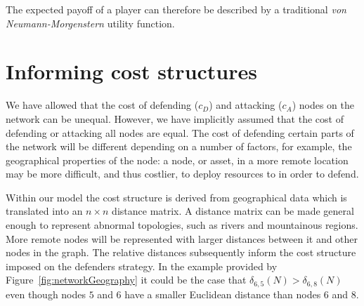 \documentclass[11pt,fleqn]{article}
\begin{document}
The expected payoff of a player can therefore be described by a traditional \emph{von Neumann-Morgenstern} utility function.

\section{Informing cost structures}

We have allowed that the cost of defending ($c_{D}$) and attacking ($c_{A}$) nodes on the network can be unequal. However, we have implicitly assumed that the cost of defending or attacking all nodes are equal. The cost of defending certain parts of the network will be different depending on a number of factors, for example, the geographical properties of the node: a node, or asset, in a more remote location may be more difficult, and thus costlier, to deploy resources to in order to defend.

Within our model the cost structure is derived from geographical data which is translated into an $n \times n$ distance matrix. A distance matrix can be made general enough to represent abnormal topologies, such as rivers and mountainous regions. More remote nodes will be represented with larger distances between it and other nodes in the graph. The relative distances subsequently inform the cost structure imposed on the defenders strategy. In the example provided by Figure~\ref{fig:networkGeography} it could be the case that $\delta_{6,5}(N) > \delta_{6,8}(N)$ even though nodes $5$ and $6$ have a smaller Euclidean distance than nodes $6$ and $8$.
\end{document}
